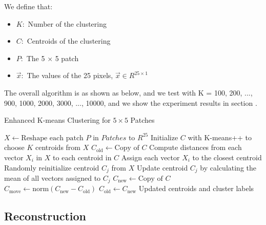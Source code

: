 \documentclass{article}
\begin{document}
We define that:

\begin{itemize}
    \item $K:$ Number of the clustering 
    \item $C:$ Centroids of the clustering
    \item $P:$ The 5 $\times$ 5 patch
    \item $\vec{x}: $ The values of the 25 pixels, $\vec{x} \in R^{25 \times 1}$
\end{itemize}


\vspace{2mm}

The overall algorithm is as shown as below, and we test with K = 100, 200, ..., 900, 1000, 2000, 3000, ..., 10000, and we show the experiment results in section .

\begin{algorithm}
\caption{Enhanced K-means Clustering for $5 \times 5$ Patches}
\begin{algorithmic}[1]
    \State $X \gets \text{Reshape each patch } P \text{ in } Patches \text{ to } R^{25}$
    \State Initialize $C$ with K-means++ to choose $K$ centroids from $X$
    \State $C_{\text{old}} \gets \text{Copy of } C$
    \Repeat
        \State Compute distances from each vector $X_i$ in $X$ to each centroid in $C$
        \State Assign each vector $X_i$ to the closest centroid
                \State Randomly reinitialize centroid $C_j$ from $X$
            \Else
                \State Update centroid $C_j$ by calculating the mean of all vectors assigned to $C_j$
            \EndIf
        \EndFor
        \State $C_{\text{new}} \gets \text{Copy of } C$
        \State $C_{\text{move}} \gets \text{norm}(C_{\text{new}} - C_{\text{old}})$
        \State $C_{\text{old}} \gets C_{\text{new}}$
    \State \Return Updated centroids and cluster labels
\EndProcedure
\end{algorithmic}
\end{algorithm}



\vspace{2mm}

\subsection{Reconstruction}
\end{document}
